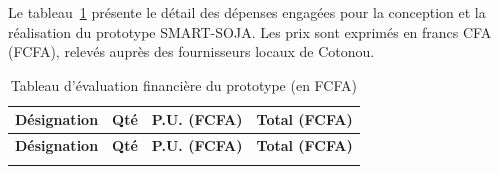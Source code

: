 Le tableau~\ref{tab:evaluation_financiere} présente le détail des dépenses engagées pour la conception et la réalisation du prototype SMART-SOJA. Les prix sont exprimés en francs CFA (FCFA), relevés auprès des fournisseurs locaux de Cotonou.

\begin{longtable}{|p{7.2cm}|c|c|c|}
\caption{Tableau d'évaluation financière du prototype (en FCFA)} \label{tab:evaluation_financiere} \\
\hline
\rowcolor{lightGray}
\textbf{Désignation} &
\textbf{Qté} &
\textbf{P.U. (FCFA)} &
\textbf{Total (FCFA)} \\ \hline
\endfirsthead
\hline
\rowcolor{lightGray}
\textbf{Désignation} &
\textbf{Qté} &
\textbf{P.U. (FCFA)} &
\textbf{Total (FCFA)} \\ \hline
\endhead
\hline
\endfoot
\hline
\endlastfoot


\end{longtable}
